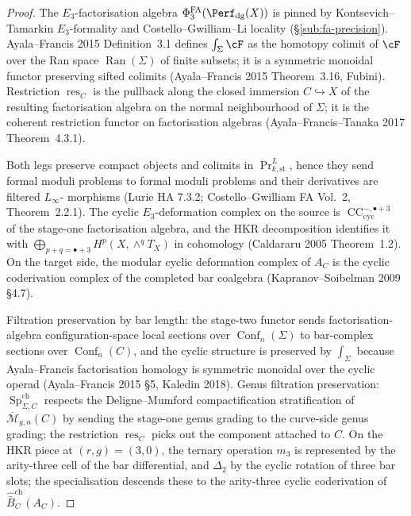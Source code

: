 \documentclass[11pt,reqno]{amsart}
\theoremstyle{plain}
\theoremstyle{definition}
\theoremstyle{remark}
\DeclareMathOperator{\Sp}{Sp}
\DeclareMathOperator{\Conf}{Conf}
\newcommand{\cM}{\mathcal{M}}
\begin{document}
\begin{proof}
The $E_3$-factorisation algebra $\Phi^{\mathrm{FA}}_3(\Perf_{\mathrm{dg}}(X))$
is pinned by Kontsevich--Tamarkin $E_3$-formality and Costello--Gwilliam--Li
locality (\S\ref{sub:fa-precision}). Ayala--Francis 2015 Definition~3.1
defines $\int_\Sigma\cF$ as the homotopy colimit of $\cF$ over the
Ran space $\operatorname{Ran}(\Sigma)$ of finite subsets; it is a
symmetric monoidal functor preserving sifted colimits
(Ayala--Francis 2015 Theorem~3.16, Fubini). Restriction
$\operatorname{res}_C$ is the pullback along the closed immersion
$C\hookrightarrow X$ of the resulting factorisation algebra on the
normal neighbourhood of $\Sigma$; it is the coherent restriction functor
on factorisation algebras (Ayala--Francis--Tanaka 2017 Theorem~4.3.1).

Both legs preserve compact objects and colimits in
$\Pr^{L}_{k,\mathrm{st}}$, hence they send formal moduli problems to
formal moduli problems and their derivatives are filtered $L_\infty$-
morphisms (Lurie HA 7.3.2; Costello--Gwilliam FA Vol.~2, Theorem~2.2.1).
The cyclic $E_3$-deformation complex on the source is
$\operatorname{CC}^{-,\bullet+3}_{\mathrm{cyc}}$ of the stage-one
factorisation algebra, and the HKR decomposition identifies it with
$\bigoplus_{p+q=\bullet+3}H^p(X,\wedge^qT_X)$ in cohomology (Caldararu
2005 Theorem~1.2). On the target side, the modular cyclic deformation
complex of $A_C$ is the cyclic coderivation complex of the completed
bar coalgebra (Kapranov--Soibelman 2009 \S4.7).

Filtration preservation by bar length: the stage-two functor sends
factorisation-algebra configuration-space local sections over
$\Conf_n(\Sigma)$ to bar-complex sections over $\Conf_n(C)$, and the
cyclic structure is preserved by $\int_\Sigma$ because Ayala--Francis
factorisation homology is symmetric monoidal over the cyclic operad
(Ayala--Francis 2015 \S5, Kaledin 2018). Genus filtration preservation:
$\Sp^{\mathrm{ch}}_{\Sigma,C}$ respects the Deligne--Mumford
compactification stratification of $\overline{\cM}_{g,n}(C)$ by sending
the stage-one genus grading to the curve-side genus grading; the
restriction $\operatorname{res}_C$ picks out the component attached to
$C$. On the HKR piece at $(r,g)=(3,0)$, the ternary operation $m_3$ is
represented by the arity-three cell of the bar differential, and
$\Delta_2$ by the cyclic rotation of three bar slots; the specialisation
descends these to the arity-three cyclic coderivation of
$\widehat{\bar B}^{\mathrm{ch}}_C(A_C)$.
\end{proof}
\end{document}
